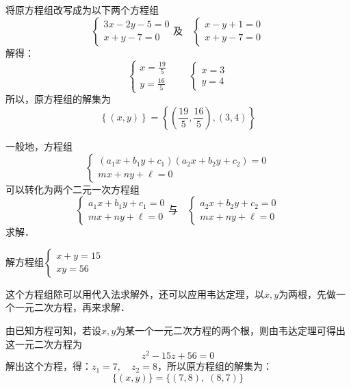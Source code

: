 \begin{solution}
    将原方程组改写成为以下两个方程组
\[\begin{cases}
    3x-2y-5=0\\
    x+y-7=0
\end{cases}\text{及}\quad \begin{cases}
    x-y+1=0\\
    x+y-7=0
\end{cases}\]
解得：
\[\begin{cases}
    x=\frac{19}{5}\\ y=\frac{16}{5}
\end{cases}\qquad \begin{cases}
    x=3\\ y=4
\end{cases}\]
所以，原方程组的解集为
\[\left\{(x,y)\right\}=\left\{\left(\frac{19}{5},\frac{16}{5}\right), (3,4)\right\}\]
\end{solution}
 
一般地，方程组
\[\begin{cases}
(a_1x+b_1y+c_1)(a_2x+b_2y+c_2)=0\\
mx+ny+\ell=0
\end{cases}\]
可以转化为两个二元一次方程组
\[\begin{cases}
a_1x+b_1y+c_1=0\\
mx+ny+\ell=0
\end{cases}\text{与}\quad \begin{cases}
a_2x+b_2y+c_2=0\\
mx+ny+\ell=0
\end{cases}\]
求解．

\begin{example}
解方程组$\begin{cases}
x+y=15\\xy=56
\end{cases}$
\end{example}

\begin{analyze}
这个方程组除可以用代入法求解外，还可以应用韦达定理，以$x,y$为两根，先做一个一元二次方程，再来求解．
\end{analyze}

\begin{solution}
由已知方程可知，若设$x,y$为某一个一元二次方程的两个根，则由韦达定理可得出这一元二次方程为
\[z^2-15z+56=0\]
解出这个方程，得：$z_1=7,\quad z_2=8$，所以原方程组的解集为：
\[\{(x,y)\}=\{(7,8),\; (8,7)\}\]
\end{solution}

